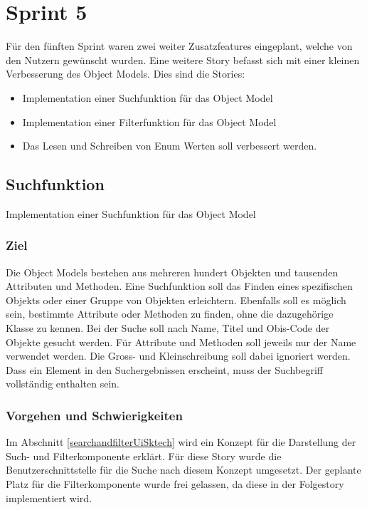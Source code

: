 \section{Sprint 5}
Für den fünften Sprint waren zwei weiter Zusatzfeatures eingeplant, welche von den Nutzern gewünscht wurden.
Eine weitere Story befasst sich mit einer kleinen Verbesserung des Object Models.
Dies sind die Stories:
\begin{itemize}
   \item Implementation einer Suchfunktion für das Object Model
   \item Implementation einer Filterfunktion für das Object Model
   \item Das Lesen und Schreiben von Enum Werten soll verbessert werden.
\end{itemize}

\subsection{Suchfunktion}
\dq Implementation einer Suchfunktion für das Object Model\dq
\subsubsection{Ziel}
Die Object Models bestehen aus mehreren hundert Objekten und tausenden Attributen und Methoden.
Eine Suchfunktion soll das Finden eines spezifischen Objekts oder einer Gruppe von Objekten erleichtern.
Ebenfalls soll es möglich sein, bestimmte Attribute oder Methoden zu finden, ohne die dazugehörige Klasse zu kennen.
Bei der Suche soll nach Name, Titel und \ac{Obis}-Code der Objekte gesucht werden.
Für Attribute und Methoden soll jeweils nur der Name verwendet werden.
Die Gross- und Kleinschreibung soll dabei ignoriert werden.
Dass ein Element in den Suchergebnissen erscheint, muss der Suchbegriff vollständig enthalten sein.

\subsubsection{Vorgehen und Schwierigkeiten}
Im Abschnitt \ref{searchandfilterUiSktech} wird ein Konzept für die Darstellung der Such- und Filterkomponente erklärt.
Für diese Story wurde die Benutzerschnittstelle für die Suche nach diesem Konzept umgesetzt.
Der geplante Platz für die Filterkomponente wurde frei gelassen, da diese in der Folgestory implementiert wird.

